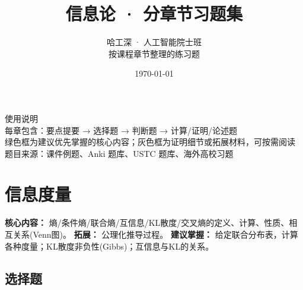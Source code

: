 \documentclass[12pt,a4paper]{ctexart}
\title{\Huge\heiti 信息论 · 分章节习题集}
\author{\large 哈工深 · 人工智能院士班 \\[2mm] 按课程章节整理的练习题}
\date{\today}
\begin{document}
\maketitle
\thispagestyle{empty}
\vfill
\begin{center}
\large\heiti 使用说明 \\[2mm]
\small
每章包含：要点提要 → 选择题 → 判断题 → 计算/证明/论述题 \\
绿色框为建议优先掌握的核心内容；灰色框为证明细节或拓展材料，可按需阅读 \\
题目来源：课件例题、Anki 题库、USTC 题库、海外高校习题
\end{center}
\newpage

\tableofcontents
\newpage

\section{信息度量}

\begin{notetested}
\textbf{核心内容：} 熵/条件熵/联合熵/互信息/KL散度/交叉熵的定义、计算、性质、相互关系(Venn图)。
\textbf{拓展：} 公理化推导过程。
\textbf{建议掌握：} 给定联合分布表，计算各种度量；KL散度非负性(Gibbs)；互信息与KL的关系。
\end{notetested}

\subsection*{选择题}
\end{document}
